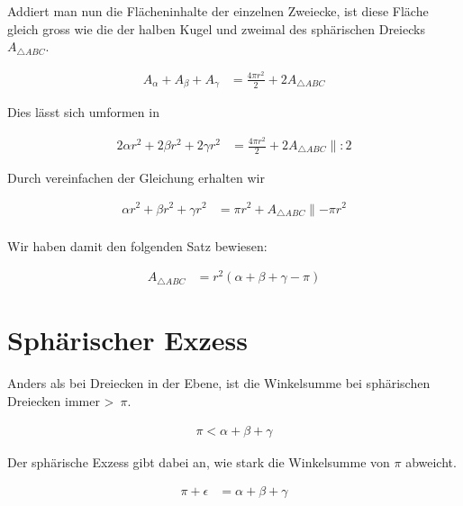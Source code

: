 \begin{refsection}
Addiert man nun die Flächeninhalte der einzelnen Zweiecke, ist diese Fläche gleich gross wie die der halben Kugel und zweimal des sphärischen Dreiecks $A_{ \triangle{ ABC }}$.

\begin{align*}
A_{ \alpha } + A_{ \beta } + A_{ \gamma } &= \frac{ 4\pi r^{ 2 } }{ 2 } + 2A_{ \triangle{ ABC }}
\end{align*}

Dies lässt sich umformen in

\begin{align*}
2\alpha r^{ 2 } + 2\beta r^{ 2 } + 2\gamma r^{ 2 } &= \frac{ 4\pi r^{ 2 } }{ 2 } + 2A_{ \triangle{ ABC }} \parallel:2
\end{align*}

Durch vereinfachen der Gleichung erhalten wir

\begin{align*}
\alpha r^{ 2 } + \beta r^{ 2 } + \gamma r^{ 2 } &= \pi r^{ 2 } + A_{ \triangle{ ABC }} \parallel-\pi r^{ 2 }\\
\end{align*}

Wir haben damit den folgenden Satz bewiesen:

\begin{satz}
\label{skript:kugel:satz:Flaecheninhalt}
\end{satz}

\begin{align*}
A_{ \triangle{ ABC }} &= r^{ 2 }\left(\alpha + \beta + \gamma - \pi\right) 
\end{align*}


\section{Sphärischer Exzess}
Anders als bei Dreiecken in der Ebene, ist die Winkelsumme bei sphärischen Dreiecken immer \textgreater \,  $\pi$.

\begin{align*}
\pi < \alpha + \beta + \gamma
\end{align*}

Der sphärische Exzess gibt dabei an, wie stark die Winkelsumme von $\pi$ abweicht.

\begin{align*}
\pi + \epsilon &= \alpha + \beta + \gamma \\
\end{align*}


\end{refsection}
